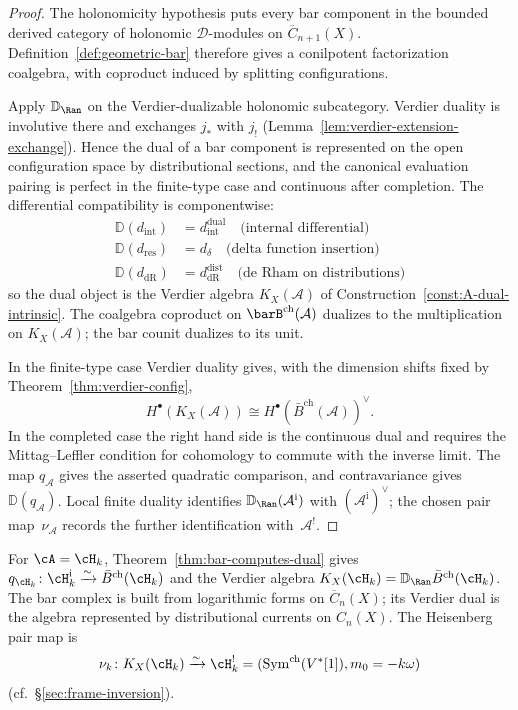 \begin{proof}
The holonomicity hypothesis puts every bar component in the
bounded derived category of holonomic $\mathcal{D}$-modules on
$\overline{C}_{n+1}(X)$. Definition~\ref{def:geometric-bar}
therefore gives a conilpotent factorization coalgebra, with
coproduct induced by splitting configurations.

Apply $\mathbb{D}_{\Ran}$ on the Verdier-dualizable holonomic
subcategory. Verdier duality is involutive there and exchanges
$j_*$ with $j_!$
(Lemma~\ref{lem:verdier-extension-exchange}). Hence the dual of a
bar component is represented on the open configuration space by
distributional sections, and the canonical evaluation pairing is
perfect in the finite-type case and continuous after completion.
The differential compatibility is componentwise:
\begin{align*}
\mathbb{D}(d_{\text{int}}) &= d_{\text{int}}^{\text{dual}} \quad \text{(internal differential)}\\
\mathbb{D}(d_{\text{res}}) &= d_{\delta} \quad \text{(delta function insertion)}\\
\mathbb{D}(d_{\text{dR}}) &= d_{\text{dR}}^{\text{dist}} \quad \text{(de Rham on distributions)}
\end{align*}
so the dual object is the Verdier algebra $K_X(\mathcal A)$ of
Construction~\ref{const:A-dual-intrinsic}.
The coalgebra coproduct on $\barB^{\mathrm{ch}}(\mathcal{A})$
dualizes to the multiplication on $K_X(\mathcal A)$; the bar counit
dualizes to its unit.

In the finite-type case Verdier duality gives, with the dimension
shifts fixed by Theorem~\ref{thm:verdier-config},
\[
H^\bullet(K_X(\mathcal A))
\cong
H^\bullet(\bar{B}^{\mathrm{ch}}(\mathcal{A}))^\vee.
\]
In the completed case the right hand side is the continuous dual and
requires the Mittag--Leffler condition for cohomology to commute with
the inverse limit.  The map $q_{\mathcal A}$ gives the asserted
quadratic comparison, and contravariance gives
$\mathbb D(q_{\mathcal A})$.  Local finite duality identifies
$\mathbb D_{\Ran}(\mathcal A^{\mathrm i})$ with
$(\mathcal A^{\mathrm i})^\vee$; the chosen pair map~$\nu_{\mathcal A}$
records the further identification with~$\mathcal A^!$.
\end{proof}

\begin{example}\label{ex:bar-dual-heisenberg}
For $\cA = \cH_k$, Theorem~\ref{thm:bar-computes-dual} gives
$q_{\cH_k}\colon\cH_k^{\mathrm i}\xrightarrow{\sim}
\bar{B}^{\mathrm{ch}}(\cH_k)$ and the Verdier algebra
$K_X(\cH_k)=\mathbb{D}_{\Ran}\bar{B}^{\mathrm{ch}}(\cH_k)$.
The bar complex is built from
logarithmic forms on $\overline{C}_n(X)$; its Verdier dual is the
algebra represented by distributional currents on $C_n(X)$.  The
Heisenberg pair map is
\[
\nu_k\colon K_X(\cH_k)\xrightarrow{\sim}\cH_k^!
= (\mathrm{Sym}^{\mathrm{ch}}(V^*[1]),m_0=-k\omega)
\]
(cf.\ \S\ref{sec:frame-inversion}).
\end{example}

